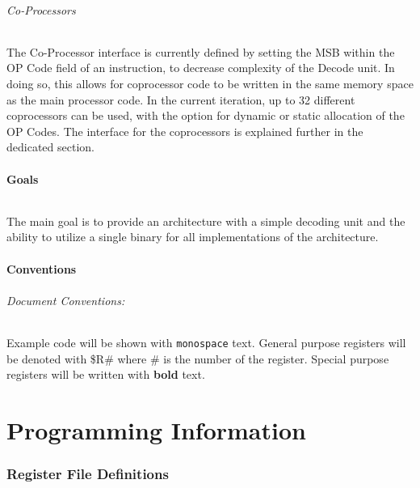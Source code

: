 \documentclass[letterpaper, 11pt]{article}
\begin{document}
\paragraph{Co-Processors}The Co-Processor interface is currently defined by setting the MSB within the OP Code field of 
an instruction, to decrease complexity of the Decode unit. In doing so, this allows for coprocessor code to be written in the same memory space as the main processor code. In the current iteration, up to 32 different coprocessors can be used, with the option for dynamic or static allocation of the OP Codes. The interface for the coprocessors is explained further in the dedicated section.

\subsection{Goals}
\paragraph{}The main goal is to provide an architecture with a simple decoding unit and the ability to utilize a single binary for all implementations of the architecture.
\subsection{Conventions}
\paragraph{Document Conventions:}Example code will be shown with \texttt{monospace} text. General purpose registers will be denoted with
\$R\# where \# is the number of the register. Special purpose registers will be written with \textbf{bold} text.

\part{Programming Information}
\section{Register File Definitions}
\end{document}
